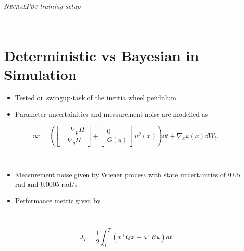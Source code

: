 \documentclass[
]{report}
\providecommand{\tightlist}{%
  \setlength{\itemsep}{0pt}\setlength{\parskip}{0pt}}\usepackage{longtable,booktabs,array}
\begin{document}
~

\emph{\textsc{NeuralPbc} training setup }

~

\hypertarget{deterministic-vs-bayesian-in-simulation}{%
\section{Deterministic vs Bayesian in
Simulation}\label{deterministic-vs-bayesian-in-simulation}}

\begin{itemize}
\tightlist
\item
  Tested on swingup-task of the inertia wheel pendulum
\item
  Parameter uncertainities and measurement noise are modelled as
\end{itemize}

\[ \dd x = \left(
        \begin{bmatrix} 
        \phantom{-}\nabla_p H \\ -\nabla_q H
        \end{bmatrix} + 
        \begin{bmatrix}0 \\ G(q)
        \end{bmatrix}u^{\theta}(x) 
        \right) \dd t + \nabla_x u(x) \dd W_t.\]

~

\begin{itemize}
\tightlist
\item
  Measurement noise given by Wiener process with state uncertainties of
  0.05 rad and 0.0005 rad/s
\item
  Performance metric given by
\end{itemize}

~

\[
J_T = \frac{1}{2}\int_0^T \left(x^\top Qx + u^\top Ru \right) dt 
\]
\end{document}

